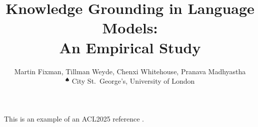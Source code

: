 \documentclass[11pt]{article}
\title{Knowledge Grounding in Language Models: \\ An Empirical Study}
\author{%
	Martin Fixman\spade{}, Tillman Weyde\spade{}, Chenxi Whitehouse\spade{}, Pranava Madhyastha\spade{} \\
	$\phantom{}^\spadesuit{}$ City St.\ George's, University of London%
}
\begin{document}
\maketitle{}

\begin{abstract}
	
\end{abstract}













This is an example of an ACL2025 reference \citep{atlas_foundational}.


\end{document}
